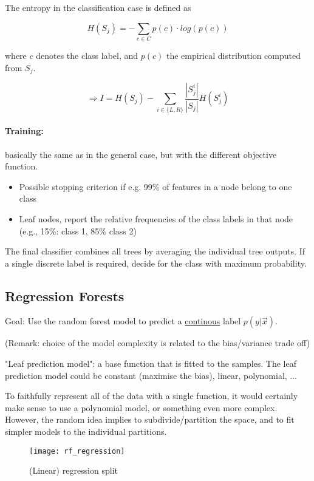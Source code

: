 The entropy in the classification case is defined as

\[H(S_j) = -\sum_{c \in C} p(c) \cdot log(p(c))\]

where \(c\) denotes the class label, and \(p(c)\) the empirical distribution computed from \(S_j\).

\[\Rightarrow I = H(S_j) - \sum_{i \in \{L,R\}} \frac{|S^i_j|}{|S_j|} H(S^i_j)\]

\paragraph{Training:} basically the same as in the general case, but with the different objective function.
\begin{itemize}
    \item Possible stopping criterion if e.g. 99\% of features in a node belong to one class
    \item Leaf nodes, report the relative frequencies of the class labels in that node (e.g., 15\%: class 1, 85\% class 2)
\end{itemize}

The final classifier combines all trees by averaging the individual tree outputs. If a single discrete label is required, decide for the class with maximum probability.


\newpage
\subsection*{Regression Forests}
Goal: Use the random forest model to predict a \underline{continous} label \(p(y|\vec{x})\).

(Remark: choice of the model complexity is related to the bias/variance trade off)

"Leaf prediction model": a base function that is fitted to the samples. The leaf prediction model could be constant (maximise the bias), linear, polynomial, ...

To faithfully represent all of the data with a single function, it would certainly make sense to use a polynomial model, or something even more complex. However, the random idea implies to subdivide/partition the space, and to fit simpler models to the individual partitions.

\begin{figure}[H]
	\centering
  \texttt{[image: rf\_regression]}
	\caption{ (Linear) regression split}
\end{figure}

